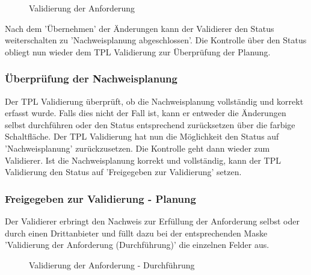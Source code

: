 \begin{figure}[H]
\caption{Validierung der Anforderung}
\end{figure}

Nach dem 'Übernehmen' der Änderungen kann der Validierer den Status weiterschalten zu 'Nachweisplanung abgeschlossen'. Die Kontrolle über den Status obliegt nun wieder dem TPL Validierung zur Überprüfung der Planung. 

\subsubsection{Überprüfung der Nachweisplanung}

Der TPL Validierung überprüft, ob die Nachweisplanung vollständig und korrekt erfasst wurde. Falls dies nicht der Fall ist, kann er entweder die Änderungen selbst durchführen oder den Status entsprechend zurücksetzen über die farbige Schaltfläche. Der TPL Validierung hat nun die Möglichkeit den Status auf 'Nachweisplanung' zurückzusetzen. Die Kontrolle geht dann wieder zum Validierer. Ist die Nachweisplanung korrekt und vollständig, kann der TPL Validierung den Status auf 'Freigegeben zur Validierung' setzen. 

\subsubsection{Freigegeben zur Validierung - Planung}

Der Validierer erbringt den Nachweis zur Erfüllung der Anforderung selbst oder durch einen Drittanbieter und füllt dazu bei der entsprechenden Maske 'Validierung der Anforderung (Durchführung)' die einzelnen Felder aus. 

\begin{figure}[H]
\caption{Validierung der Anforderung - Durchführung}
\end{figure}


